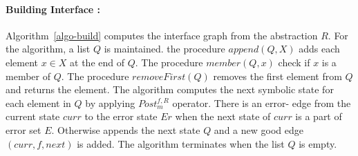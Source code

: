 \documentclass{llncs}
\begin{document}
\paragraph{Building Interface :} Algorithm~\ref{algo-build} computes the interface graph from the abstraction $R$.
For the algorithm, a list $Q$ is maintained.  
the procedure $append(Q,X)$ adds each element $x \in X$ at the end of $Q$.
The procedure $member(Q,x)$ check if $x$ is a member of $Q$.
The procedure $removeFirst (Q)$ removes the first element from $Q$ and returns the element.
The algorithm computes the next symbolic state for each element in $Q$ by applying $Post^{f,R}_m$ operator. 
There is an error- edge from the current state 
$curr$ to the error state $Er$ when the next state of $curr$ is a part of error set $E$.
Otherwise appends the next state $Q$ and a new good edge $(curr,f,next)$ is added.
The algorithm terminates when the list $Q$ is empty.
\end{document}
